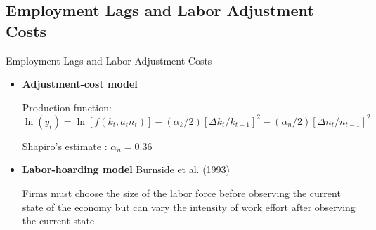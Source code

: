 \documentclass[10pt]{beamer}
\begin{document}


\subsection{Employment Lags and Labor Adjustment Costs}
\begin{frame}{Employment Lags and Labor Adjustment Costs}
	\begin{itemize}
		\item \textbf{Adjustment-cost model}
		      
		      Production function: $$ \ln \left(y_t\right)= \ln \left[f\left(k_t, a_t
		      	n_t\right)\right] -\left(\alpha_{k} / 2\right)\left[\Delta k_t /
		      	k_{t-1}\right]^2 -\left(\alpha_n / 2\right)\left[\Delta n_t / n_{t-1}\right]^2
		      		$$
		      		
		      		Shapiro's estimate : $\alpha_{n} = 0.36$
		      		
		      		\item \textbf{Labor-hoarding model} Burnside et al. (1993)
		      		
		      		Firms must choose the size of the labor force before observing the current
		      		state of the economy but can vary the intensity of work effort after observing
		      		the current state
		      		\end{itemize}
		      		
		      		\end{frame}
		      		
\end{document}
